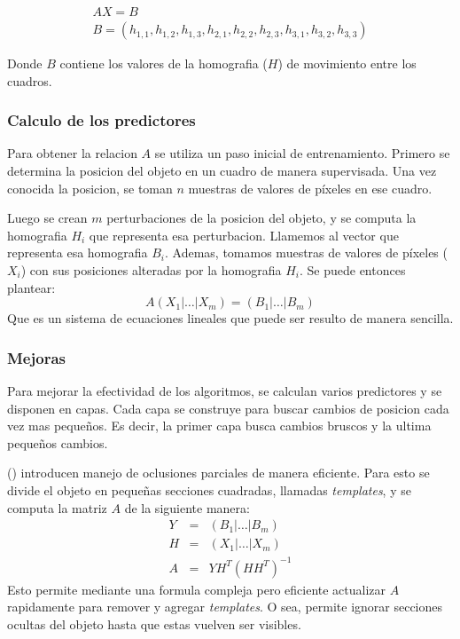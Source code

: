 \documentclass[a4paper,10pt]{article}
\begin{document}
\begin{eqnarray*}
    AX = B \\
    B = (h_{1,1}, h_{1,2}, h_{1,3}, h_{2,1}, h_{2,2}, h_{2,3}, h_{3,1}, h_{3,2}, h_{3,3})
\end{eqnarray*}

Donde $B$ contiene los valores de la homografia ($H$) de movimiento entre los cuadros.

\subsubsection{Calculo de los predictores}
Para obtener la relacion $A$ se utiliza un paso inicial de entrenamiento.
Primero se determina la posicion del objeto en un cuadro de manera supervisada.
Una vez conocida la posicion, se toman $n$ muestras de valores de píxeles en ese cuadro.

Luego se crean $m$ perturbaciones de la posicion del objeto, y se computa la homografia $H_i$ que representa esa perturbacion.
Llamemos al vector que representa esa homografia $B_i$.
Ademas, tomamos muestras de valores de píxeles ($X_i$) con sus posiciones alteradas por la homografia $H_i$.
Se puede entonces plantear:
\begin{equation}
    A \left( X_1 \lvert \dots \lvert X_m \right) = \left( B_1 \lvert \dots \lvert B_m \right)
\end{equation}
Que es un sistema de ecuaciones lineales que puede ser resulto de manera sencilla.

\subsubsection{Mejoras}

Para mejorar la efectividad de los algoritmos, se calculan varios predictores y se disponen en capas.
Cada capa se construye para buscar cambios de posicion cada vez mas pequeños.
Es decir, la primer capa busca cambios bruscos y la ultima pequeños cambios.

\citeauthor*{alp} (\cite{alp}) introducen manejo de oclusiones parciales de manera eficiente.
Para esto se divide el objeto en pequeñas secciones cuadradas, llamadas \textit{templates}, y se computa la matriz $A$ de la siguiente manera:
\begin{eqnarray*}
    Y &=& \left( B_1 \lvert \dots \lvert B_m \right) \\
    H &=& \left( X_1 \lvert \dots \lvert X_m \right) \\
    A &=& Y H^T(HH^T)^{-1}
\end{eqnarray*}
Esto permite mediante una formula compleja pero eficiente actualizar $A$ rapidamente para remover y agregar \textit{templates}.
O sea, permite ignorar secciones ocultas del objeto hasta que estas vuelven ser visibles.
\end{document}
